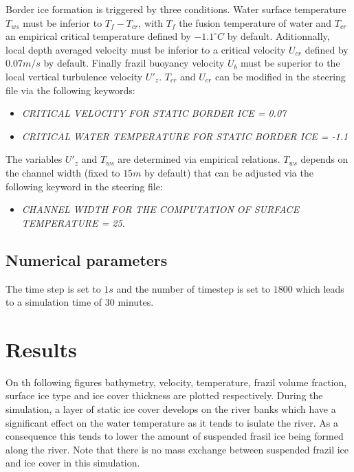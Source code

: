 Border ice formation is triggered by three conditions. Water surface temperature $T_{ws}$ must be inferior to  $T_f-T_{cr}$, with $T_f$ the fusion temperature of water and $T_{cr}$ an empirical critical temperature defined by $-1.1^{\circ} C$ by default. Aditionnally, local depth averaged velocity must be inferior to a critical velocity $U_{cr}$ defined by $0.07 m/s$ by default. Finally frazil buoyancy velocity $U_b$ must be superior to the local vertical turbulence velocity $U'_z$. $T_{cr}$ and $U_{cr}$ can be modified in the \khione steering file via the following keywords:
\begin{itemize}
	\item\textit{CRITICAL VELOCITY FOR STATIC BORDER ICE = 0.07}
	\item\textit{CRITICAL WATER TEMPERATURE FOR STATIC BORDER ICE = -1.1}
\end{itemize}
The variables $U'_z$ and $T_{ws}$ are determined via empirical relations. $T_{ws}$ depends on the channel width (fixed to $15m$ by default) that can be adjusted via the following keyword in the \khione steering file:
\begin{itemize}
	\item\textit{CHANNEL WIDTH FOR THE COMPUTATION OF SURFACE TEMPERATURE = 25.}
\end{itemize}

\subsection{Numerical parameters}
The time step is set to $1s$ and the number of timestep is set to $1800$ which leads to a simulation time of $30$ minutes.

\section{Results}

On th following figures bathymetry, velocity, temperature, frazil volume fraction, surface ice type and ice cover thickness are plotted respectively. During the simulation, a layer of static ice cover develops on the river banks which have a significant effect on the water temperature as it tends to isulate the river. As a consequence this tends to lower the amount of suspended frasil ice being formed along the river. Note that there is no mass exchange between suspended frazil ice and ice cover in this simulation.

